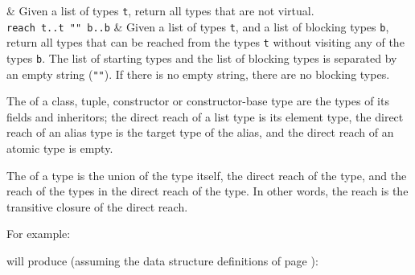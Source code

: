 \begin{desctab}
&
Given a list of types {\tt t}, return all types that are not virtual.
\\
{\tt reach t..t "" b..b}
&
Given a list of types {\tt t}, and a list of blocking types {\tt b},
return all types that can be reached from
the types {\tt t} without visiting any of the types {\tt b}.
The list of starting types and the list of blocking types is separated
by an empty string ({\tt ""}). If there is no empty string, there are
no blocking types.
\par
The  of a class, tuple, constructor
or constructor-base type are the types of its fields and inheritors;
the direct reach of a list type is its element type, the direct reach
of an alias type is the target type of the alias, and the direct reach
of an atomic type is empty.
\par
The  of a type is the union of the type itself, the direct
reach of the type, and the reach of the types in the direct reach of
the type.  In other words, the reach is the transitive closure of the
direct reach.
\\
\end{desctab}
For example:
\begin{showfile}

\end{showfile}
will produce (assuming the data structure definitions of page \pageref{plotds}):
\begin{showfile}

\end{showfile}
